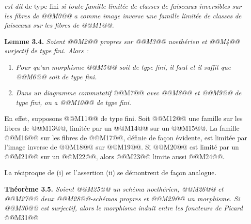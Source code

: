 
\emph{est dit} de type fini \emph{si toute famille limit\'ee de classes de faisceaux inversibles sur les fibres de @@M0@@ a comme image inverse une famille limit\'ee de classes de faisceaux sur les fibres de @@M1@@.}

\textbf{Lemme 3.4.} \emph{Soient @@M2@@ propres sur @@M3@@ noeth\'erien et @@M4@@ surjectif de type fini. Alors}~:
\begin{enumerate}[label=(\roman*)]
\item \emph{Pour qu'un morphisme @@M5@@ soit de type fini, il faut et il suffit que @@M6@@ soit de type fini.}
\item \emph{Dans un diagramme commutatif}
@@M7@@
\emph{avec @@M8@@ et @@M9@@ de type fini, on a @@M10@@ de type fini.}
\end{enumerate}

En effet, supposons @@M11@@ de type fini. Soit @@M12@@ une famille sur les fibres de @@M13@@, limit\'ee par un @@M14@@ sur un @@M15@@. La famille @@M16@@ sur les fibres de @@M17@@, d\'efinie de fa\c{c}on \'evidente, est limit\'ee par l'image inverse de @@M18@@ sur @@M19@@. Si @@M20@@ est limit\'e par un @@M21@@ sur un @@M22@@, alors @@M23@@ limite aussi @@M24@@.

La r\'eciproque de (i) et l'assertion (ii) se d\'emontrent de fa\c{c}on analogue.

\textbf{Th\'eor\`eme 3.5.} \emph{Soient @@M25@@ un sch\'ema noeth\'erien, @@M26@@ et @@M27@@ deux @@M28@@-sch\'emas propres et @@M29@@ un morphisme. Si @@M30@@ est surjectif, alors le morphisme induit entre les foncteurs de Picard}
@@M31@@
